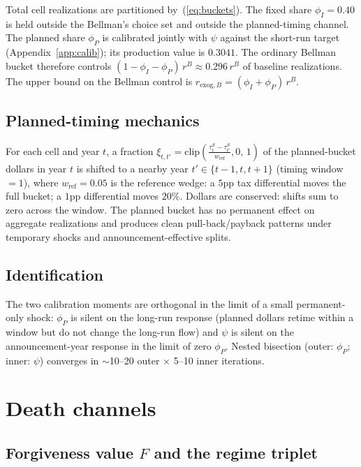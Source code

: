 \documentclass[11pt]{article}
\newcommand{\tauS}{\tau^{S}}
\newcommand{\rB}{r^{B}}
\begin{document}
Total cell realizations are partitioned by~(\ref{eq:buckets}). The fixed
share $\phi_I = 0.40$ is held outside the Bellman's choice set and outside
the planned-timing channel. The planned share $\phi_P$ is calibrated jointly
with $\psi$ against the short-run target (Appendix~\ref{app:calib}); its
production value is $0.3041$. The ordinary Bellman bucket therefore controls
$(1 - \phi_I - \phi_P)\,\rB \approx 0.296\,\rB$ of baseline realizations.
The upper bound on the Bellman control is
$r_{\text{exog},B} = (\phi_I + \phi_P)\,\rB$.

\subsection{Planned-timing mechanics}

For each cell and year $t$, a fraction
$\xi_{t,t'} = \mathrm{clip}\!\left(\frac{\tauS_{t} - \tauS_{t'}}{w_{\text{ref}}},
                                   0,\, 1\right)$
of the planned-bucket dollars in year $t$ is shifted to a nearby year
$t' \in \{t-1, t, t+1\}$ (timing window $= 1$), where $w_{\text{ref}} = 0.05$
is the reference wedge: a $5$pp tax differential moves the full bucket; a
$1$pp differential moves $20\%$. Dollars are conserved: shifts sum to zero
across the window. The planned bucket has no permanent effect on aggregate
realizations and produces clean pull-back/payback patterns under temporary
shocks and announcement-effective splits.

\subsection{Identification}

The two calibration moments are orthogonal in the limit of a small
permanent-only shock: $\phi_P$ is silent on the long-run response (planned
dollars retime within a window but do not change the long-run flow) and
$\psi$ is silent on the announcement-year response in the limit of zero
$\phi_P$. Nested bisection (outer: $\phi_P$; inner: $\psi$) converges in
$\sim$10--20 outer $\times$ 5--10 inner iterations.

\section{Death channels}
\label{app:death}

\subsection{Forgiveness value $F$ and the regime triplet}
\end{document}
